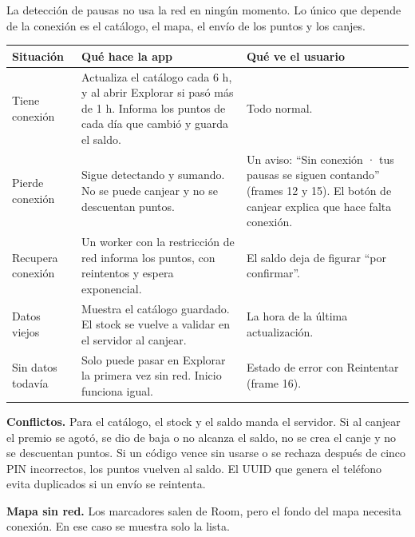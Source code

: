 La detección de pausas no usa la red en ningún momento. Lo único que depende de la conexión es el catálogo, el mapa, el envío de los puntos y los canjes.

\begin{table}[H]
\centering\small
\begin{tabularx}{\textwidth}{@{}l L L@{}}
\toprule
\textbf{Situación} & \textbf{Qué hace la app} & \textbf{Qué ve el usuario} \\
\midrule
Tiene conexión & Actualiza el catálogo cada 6 h, y al abrir Explorar si pasó más de 1 h. Informa los puntos de cada día que cambió y guarda el saldo. & Todo normal. \\
Pierde conexión & Sigue detectando y sumando. No se puede canjear y no se descuentan puntos. & Un aviso: “Sin conexión · tus pausas se siguen contando” (frames 12 y 15). El botón de canjear explica que hace falta conexión. \\
Recupera conexión & Un worker con la restricción de red informa los puntos, con reintentos y espera exponencial. & El saldo deja de figurar “por confirmar”. \\
Datos viejos & Muestra el catálogo guardado. El stock se vuelve a validar en el servidor al canjear. & La hora de la última actualización. \\
Sin datos todavía & Solo puede pasar en Explorar la primera vez sin red. Inicio funciona igual. & Estado de error con Reintentar (frame 16). \\
\bottomrule
\end{tabularx}
\end{table}

\textbf{Conflictos.} Para el catálogo, el stock y el saldo manda el servidor. Si al canjear el premio se agotó, se dio de baja o no alcanza el saldo, no se crea el canje y no se descuentan puntos. Si un código vence sin usarse o se rechaza después de cinco PIN incorrectos, los puntos vuelven al saldo. El UUID que genera el teléfono evita duplicados si un envío se reintenta.

\textbf{Mapa sin red.} Los marcadores salen de Room, pero el fondo del mapa necesita conexión. En ese caso se muestra solo la lista.
